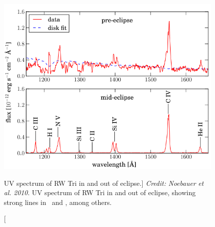 \begin{figure}
\centering
\includegraphics[width=1.0\textwidth]{figures/02-outflows/rwtri_noe.png}
\caption
[UV spectrum of RW Tri in and out of eclipse.]
{
{\sl Credit: Noebauer et al. 2010}.
UV spectrum of RW Tri in and out of eclipse, showing strong lines in 
\civfull\ and \la, among others.
} 
\label{fig:NL_spec_uv}
\end{figure}


